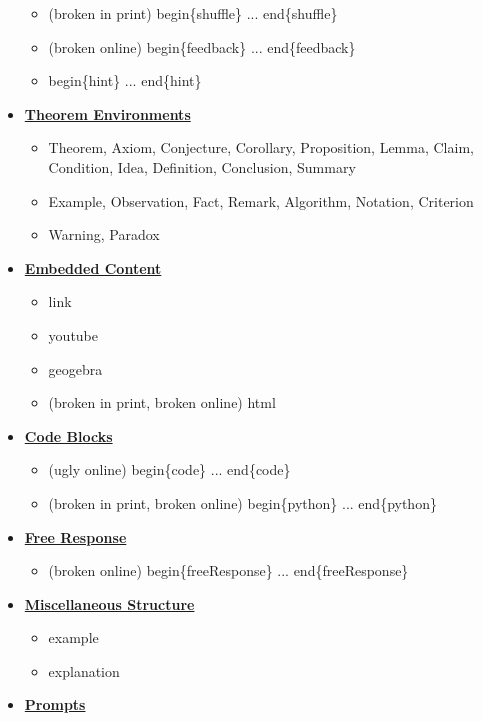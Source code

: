 \documentclass{ximera}
\begin{document}
\begin{remark}
\begin{itemize}
\begin{itemize}
    \item (broken in print) begin\{shuffle\} ... end\{shuffle\}
    \item (broken online) begin\{feedback\} ... end\{feedback\}
    \item begin\{hint\} ... end\{hint\}
  \end{itemize}
\item \hyperref[TheoremEnvironments]{\textbf{Theorem Environments}}
  \begin{itemize}
    \item Theorem, Axiom, Conjecture, Corollary, Proposition, Lemma, Claim, Condition, Idea, Definition, Conclusion, Summary
    \item Example, Observation, Fact, Remark, Algorithm, Notation, Criterion
    \item Warning, Paradox
  \end{itemize}
\item \hyperref[EmbeddedContent]{\textbf{Embedded Content}}
  \begin{itemize}
    \item link
    \item youtube
    \item geogebra
    \item (broken in print, broken online) html
  \end{itemize}
\item \hyperref[CodeAnswers]{\textbf{Code Blocks}}
  \begin{itemize}
    \item (ugly online) begin\{code\} ... end\{code\}
    \item (broken in print, broken online) begin\{python\} ... end\{python\}
  \end{itemize}
\item \hyperref[FRAnswerType]{\textbf{Free Response}}
  \begin{itemize}   
    \item (broken online) begin\{freeResponse\} ... end\{freeResponse\}
  \end{itemize}
\item \hyperref[StructuralEnvironments]{\textbf{Miscellaneous Structure}}
  \begin{itemize}
    \item example
    \item explanation
  \end{itemize}
\item \hyperref[Prompts]{\textbf{Prompts}}
  \begin{itemize}

\end{itemize}
\end{itemize}
\end{remark}
\end{document}
